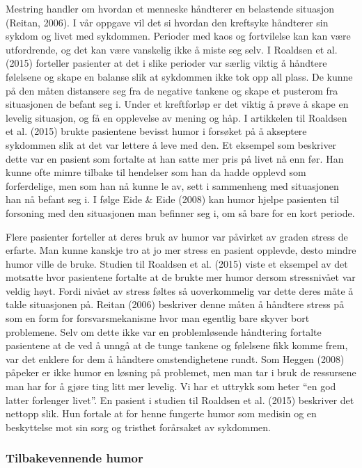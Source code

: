 Mestring handler om hvordan et menneske håndterer en belastende situasjon
(Reitan, 2006). I vår oppgave vil det si hvordan den kreftsyke håndterer sin
sykdom og livet med sykdommen.  Perioder med kaos og fortvilelse kan kan være
utfordrende, og det kan være vanskelig ikke å miste seg selv. I Roaldsen et al.
(2015) forteller pasienter at det i slike perioder var særlig viktig å håndtere
følelsene og skape en balanse slik at sykdommen ikke tok opp all plass. De
kunne på den måten distansere seg fra de negative tankene og skape et pusterom
fra situasjonen de befant seg i. Under et kreftforløp er det viktig å prøve å
skape en levelig situasjon, og få en opplevelse av mening og håp. I artikkelen
til Roaldsen et al. (2015) brukte pasientene bevisst humor i forsøket på å
akseptere sykdommen slik at det var lettere å leve med den. Et eksempel som
beskriver dette var en pasient som fortalte at han satte mer pris på livet nå
enn før. Han kunne ofte mimre tilbake til hendelser som han da hadde opplevd
som forferdelige, men som han nå kunne le av, sett i sammenheng med situasjonen
han nå befant seg i. I følge Eide \&{} Eide (2008) kan humor hjelpe pasienten til
forsoning med den situasjonen man befinner seg i, om så bare for en kort
periode.

Flere pasienter forteller at deres bruk av humor var påvirket av graden stress
de erfarte. Man kunne kanskje tro at jo mer stress en pasient opplevde, desto
mindre humor ville de bruke. Studien til Roaldsen et al. (2015) viste et
eksempel av det motsatte hvor pasientene fortalte at de brukte mer humor dersom
stressnivået var veldig høyt. Fordi nivået av stress føltes så uoverkommelig
var dette deres måte å takle situasjonen på. Reitan (2006) beskriver denne
måten å håndtere stress på som en form for forsvarsmekanisme hvor man egentlig
bare skyver bort problemene. Selv om dette ikke var en problemløsende
håndtering fortalte pasientene at de ved å unngå at de tunge tankene og
følelsene fikk komme frem, var det enklere for dem å håndtere omstendighetene
rundt. Som Heggen (2008) påpeker er ikke humor en løsning på problemet, men man
tar i bruk de ressursene man har for å gjøre ting litt mer levelig. Vi har et
uttrykk som heter “en god latter forlenger livet”. En pasient i studien til
Roaldsen et al. (2015) beskriver det nettopp slik. Hun fortale at for henne
fungerte humor som medisin og en beskyttelse mot sin sorg og tristhet
forårsaket av sykdommen.

\subsubsection{Tilbakevennende humor}

